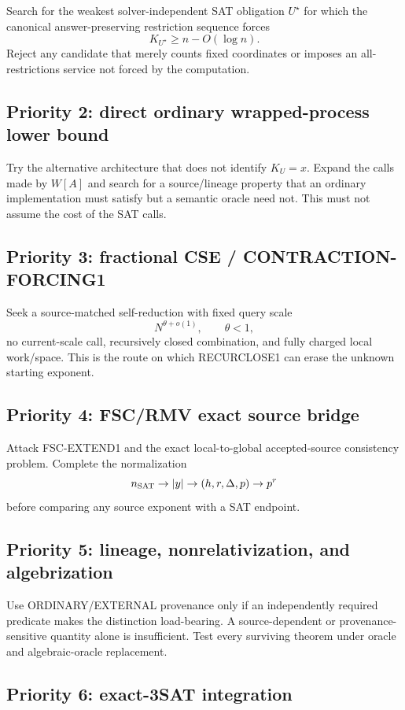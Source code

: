 \documentclass[11pt]{article}
\theoremstyle{plain}
\theoremstyle{definition}
\theoremstyle{remark}
\begin{document}
Search for the weakest solver-independent SAT obligation \(U^\star\) for which
the canonical answer-preserving restriction sequence forces
\[
K_{U^\star}\ge n-O(\log n).
\]
Reject any candidate that merely counts fixed coordinates or imposes an
all-restrictions service not forced by the computation.

\subsection{Priority 2: direct ordinary wrapped-process lower bound}

Try the alternative architecture that does not identify \(K_U=x\).  Expand
the calls made by \(W[A]\) and search for a source/lineage property that an
ordinary implementation must satisfy but a semantic oracle need not.  This
must not assume the cost of the SAT calls.

\subsection{Priority 3: fractional CSE / CONTRACTION-FORCING1}

Seek a source-matched self-reduction with fixed query scale
\[
N^{\theta+o(1)},\qquad \theta<1,
\]
no current-scale call, recursively closed combination, and fully charged
local work/space.  This is the route on which RECURCLOSE1 can erase the
unknown starting exponent.

\subsection{Priority 4: FSC/RMV exact source bridge}

Attack FSC-EXTEND1 and the exact local-to-global accepted-source consistency
problem.  Complete the normalization
\[
n_{\rm SAT}\to |y|\to(h,r,\Delta,p)\to p^r
\]
before comparing any source exponent with a SAT endpoint.

\subsection{Priority 5: lineage, nonrelativization, and algebrization}

Use ORDINARY/EXTERNAL provenance only if an independently required predicate
makes the distinction load-bearing.  A source-dependent or
provenance-sensitive quantity alone is insufficient.  Test every surviving
theorem under oracle and algebraic-oracle replacement.

\subsection{Priority 6: exact-3SAT integration}
\end{document}
